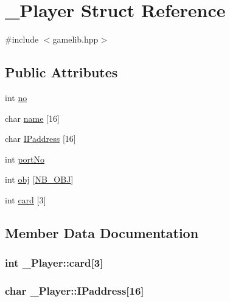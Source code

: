 \hypertarget{struct___player}{}\section{\+\_\+\+Player Struct Reference}
\label{struct___player}


{\ttfamily \#include $<$gamelib.\+hpp$>$}

\subsection*{Public Attributes}
\begin{DoxyCompactItemize}
\item 
int \hyperlink{struct___player_a962d40b7ae74f37b92caffdd783a12ee}{no}
\item 
char \hyperlink{struct___player_a9a87b96be77fbbac4a6fcd0606994a9c}{name} \mbox{[}16\mbox{]}
\item 
char \hyperlink{struct___player_ab2080f24e414abb071699955f8901c9b}{I\+Paddress} \mbox{[}16\mbox{]}
\item 
int \hyperlink{struct___player_aca73f3888d3a1f70320603b8af81ac62}{port\+No}
\item 
int \hyperlink{struct___player_abb9d194d90baed848f51eebfca8903c9}{obj} \mbox{[}\hyperlink{gamelib_8hpp_a4e075bf3de224196253c911045648e71}{N\+B\+\_\+\+O\+BJ}\mbox{]}
\item 
int \hyperlink{struct___player_a0709887e5a2bf3e6ebb0b3f23e51dcf0}{card} \mbox{[}3\mbox{]}
\end{DoxyCompactItemize}


\subsection{Member Data Documentation}
\subsubsection[{\texorpdfstring{card}{card}}]{\setlength{\rightskip}{0pt plus 5cm}int \+\_\+\+Player\+::card\mbox{[}3\mbox{]}}\hypertarget{struct___player_a0709887e5a2bf3e6ebb0b3f23e51dcf0}{}\label{struct___player_a0709887e5a2bf3e6ebb0b3f23e51dcf0}
\subsubsection[{\texorpdfstring{I\+Paddress}{IPaddress}}]{\setlength{\rightskip}{0pt plus 5cm}char \+\_\+\+Player\+::\+I\+Paddress\mbox{[}16\mbox{]}}\hypertarget{struct___player_ab2080f24e414abb071699955f8901c9b}{}\label{struct___player_ab2080f24e414abb071699955f8901c9b}
